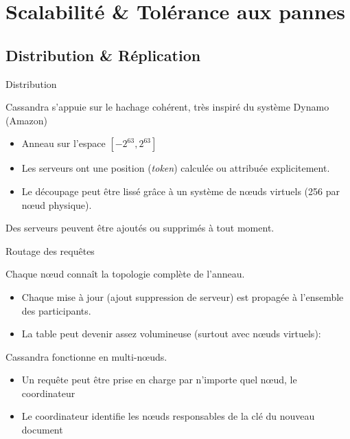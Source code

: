 

\section[Scalable]{Scalabilité \& Tolérance aux pannes}

\subsection{Distribution \& Réplication}

\begin{frame}[fragile]{Distribution}

Cassandra s'appuie sur le hachage cohérent, très inspiré du système Dynamo (Amazon)

\begin{itemize}
	\item Anneau sur l'espace $[-2^{63}, 2^{63}]$
	  
	  
	  \item Les serveurs ont une position (\textit{token}) calculée ou attribuée
	      explicitement.
	      
	    \item Le découpage peut être lissé grâce à un système de nœuds virtuels (256 par nœud physique).
\end{itemize}

\vfill

Des serveurs peuvent être ajoutés ou supprimés à tout moment.

\end{frame}

\begin{frame}[fragile]{Routage des requêtes}

Chaque nœud connaît la topologie complète de l'anneau.
    
\begin{itemize}
          \item Chaque mise à jour (ajout suppression de serveur) est propagée à l'ensemble
              des participants.
          \item La table peut devenir assez volumineuse (surtout avec nœuds virtuels): 
\end{itemize}
      
\vfill

Cassandra fonctionne en \alert{multi-nœuds}.

\begin{itemize}
          \item Un requête peut être prise en charge par n'importe quel nœud, le \alert{coordinateur}
          \item Le coordinateur identifie les nœuds responsables de la clé du nouveau document
\end{itemize}

\end{frame}

